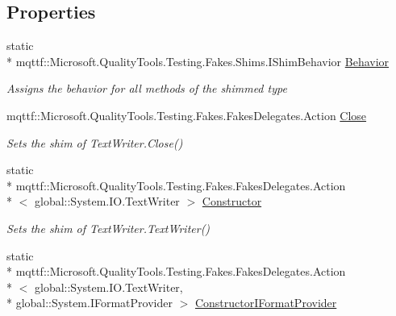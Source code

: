 \subsection*{Properties}
\begin{DoxyCompactItemize}
\item 
static \\*
mqttf\-::\-Microsoft.\-Quality\-Tools.\-Testing.\-Fakes.\-Shims.\-I\-Shim\-Behavior \hyperlink{class_system_1_1_i_o_1_1_fakes_1_1_shim_text_writer_a0306efbc932f054655eb61bc2ceb8025}{Behavior}
\begin{DoxyCompactList}\small\item\em Assigns the behavior for all methods of the shimmed type\end{DoxyCompactList}\item 
mqttf\-::\-Microsoft.\-Quality\-Tools.\-Testing.\-Fakes.\-Fakes\-Delegates.\-Action \hyperlink{class_system_1_1_i_o_1_1_fakes_1_1_shim_text_writer_a76c1f3bf75bc49b0e760d7af23b1bdb2}{Close}
\begin{DoxyCompactList}\small\item\em Sets the shim of Text\-Writer.\-Close()\end{DoxyCompactList}\item 
static \\*
mqttf\-::\-Microsoft.\-Quality\-Tools.\-Testing.\-Fakes.\-Fakes\-Delegates.\-Action\\*
$<$ global\-::\-System.\-I\-O.\-Text\-Writer $>$ \hyperlink{class_system_1_1_i_o_1_1_fakes_1_1_shim_text_writer_a87630a745e00c3754fa35638ccb4f77b}{Constructor}
\begin{DoxyCompactList}\small\item\em Sets the shim of Text\-Writer.\-Text\-Writer()\end{DoxyCompactList}\item 
static \\*
mqttf\-::\-Microsoft.\-Quality\-Tools.\-Testing.\-Fakes.\-Fakes\-Delegates.\-Action\\*
$<$ global\-::\-System.\-I\-O.\-Text\-Writer, \\*
global\-::\-System.\-I\-Format\-Provider $>$ \hyperlink{class_system_1_1_i_o_1_1_fakes_1_1_shim_text_writer_a94b91d20895d96b27a7527c40c4d9d5b}{Constructor\-I\-Format\-Provider}

\end{DoxyCompactItemize}
